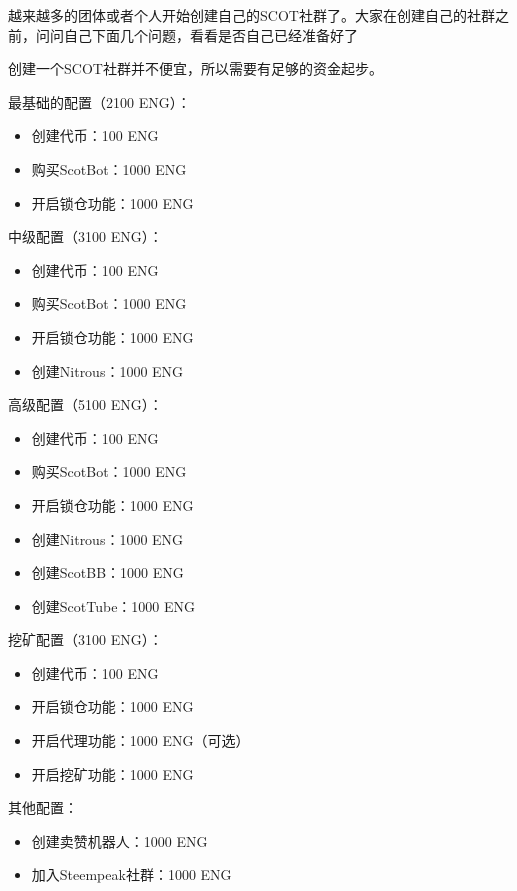 \documentclass[]{ctexbook}
\providecommand{\tightlist}{%
  \setlength{\itemsep}{0pt}\setlength{\parskip}{0pt}}
\begin{document}
越来越多的团体或者个人开始创建自己的SCOT社群了。大家在创建自己的社群之前，问问自己下面几个问题，看看是否自己已经准备好了

创建一个SCOT社群并不便宜，所以需要有足够的资金起步。

最基础的配置（2100 ENG）：

\begin{itemize}
\tightlist
\item
  创建代币：100 ENG
\item
  购买ScotBot：1000 ENG
\item
  开启锁仓功能：1000 ENG
\end{itemize}

中级配置（3100 ENG）：

\begin{itemize}
\tightlist
\item
  创建代币：100 ENG
\item
  购买ScotBot：1000 ENG
\item
  开启锁仓功能：1000 ENG
\item
  创建Nitrous：1000 ENG
\end{itemize}

高级配置（5100 ENG）：

\begin{itemize}
\tightlist
\item
  创建代币：100 ENG
\item
  购买ScotBot：1000 ENG
\item
  开启锁仓功能：1000 ENG
\item
  创建Nitrous：1000 ENG
\item
  创建ScotBB：1000 ENG
\item
  创建ScotTube：1000 ENG
\end{itemize}

挖矿配置（3100 ENG）：

\begin{itemize}
\tightlist
\item
  创建代币：100 ENG
\item
  开启锁仓功能：1000 ENG
\item
  开启代理功能：1000 ENG（可选）
\item
  开启挖矿功能：1000 ENG
\end{itemize}

其他配置：

\begin{itemize}
\tightlist
\item
  创建卖赞机器人：1000 ENG
\item
  加入Steempeak社群：1000 ENG
\end{itemize}
\end{document}
